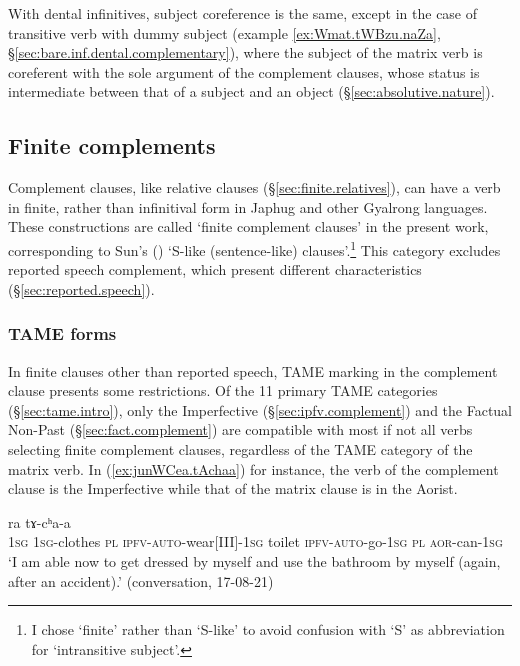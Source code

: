 With dental infinitives, subject coreference is the same, except in the case of transitive verb with dummy subject (example \ref{ex:Wmat.tWBzu.naZa}, §\ref{sec:bare.inf.dental.complementary}), where the subject of the matrix verb is coreferent with the sole argument of the complement clauses, whose status is intermediate between that of a subject and an object (§\ref{sec:absolutive.nature}).

 \subsection{Finite complements} \label{sec:finite.complement}
 Complement clauses, like relative clauses (§\ref{sec:finite.relatives}), can have a verb in finite, rather than infinitival form in Japhug and other Gyalrong languages. These constructions are called `finite complement clauses' in the present work, corresponding to Sun's (\citeyear[475-477]{sun12complementation})  `S-like (sentence-like) clauses'.\footnote{I chose `finite' rather than `S-like' to avoid confusion with `S' as abbreviation for  `intransitive subject'.   } This category excludes reported speech complement, which present different characteristics (§\ref{sec:reported.speech}).

 \subsubsection{TAME forms} \label{sec:TAM.finite}
In finite clauses other than reported speech, TAME marking in the complement clause presents some restrictions. Of the 11 primary TAME categories (§\ref{sec:tame.intro}), only the Imperfective (§\ref{sec:ipfv.complement}) and the Factual Non-Past (§\ref{sec:fact.complement}) are compatible with most if not all verbs selecting finite complement clauses, regardless of the TAME category of the matrix verb. In (\ref{ex:junWCea.tAchaa}) for instance, the verb of the complement clause is the Imperfective while that of the matrix clause is in the Aorist.

\begin{exe}
\ex \label{ex:junWCea.tAchaa}
  ra tɤ-cʰa-a \\
 \textsc{1sg} \textsc{1sg}-clothes \textsc{pl} \textsc{ipfv}-\textsc{auto}-wear[III]-\textsc{1sg} toilet \textsc{ipfv}-\textsc{auto}-go-\textsc{1sg} \textsc{pl} \textsc{aor}-can-\textsc{1sg} \\
 \glt  `I am able now to get dressed by myself and use the bathroom by myself (again, after an accident).' (conversation, 17-08-21)
 \end{exe}

